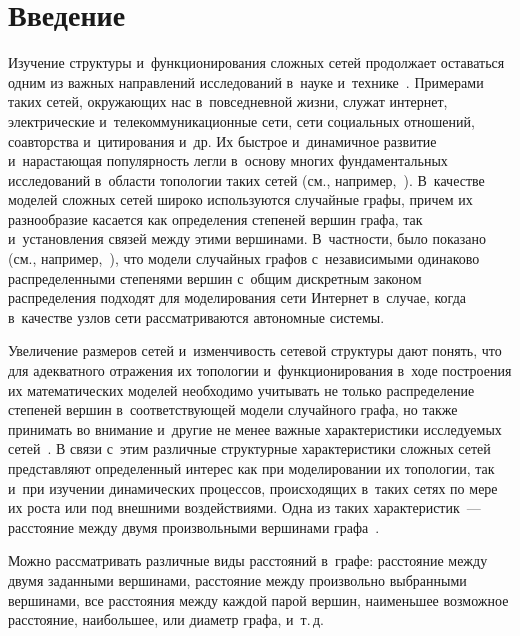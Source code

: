 
\thispagestyle{headings}

\begin{multicols}{2}

\label{st\stat}

\section{Введение}

\vspace*{-1pt}

Изучение структуры и~функционирования сложных сетей продолжает оставаться одним из важных
направлений исследований в~науке и~технике~\cite{Dur,Hof1}. Примерами таких сетей, окружающих
нас в~повседневной жизни, служат интернет, электрические и~телекоммуникационные сети, сети
социальных отношений, соавторства и~цитирования и~др.
Их быст\-рое и~динамичное развитие и~нарастающая популярность легли в~основу многих фундаментальных
исследований в~об\-ласти топологии таких сетей (см., например,~\cite{Dur,Hof1,Hof2,New1,New2}).
В~качестве моделей слож\-ных сетей широко используются случайные графы, причем их разнообразие
касается как определения степеней вершин графа, так и~уста\-нов\-ле\-ния связей между этими вершинами.
В~частности, было показано (см., например,~\cite{Fa,RN}), что модели случайных графов с~независимыми
одинаково распределенными степенями вершин с~общим дискретным законом распределения подходят для
моделирования сети Интернет в~случае, когда в~качестве узлов сети рассматриваются автономные системы.

Увеличение размеров сетей и~изменчивость сетевой структуры дают понять, что для адекватного отражения
их топологии и~функционирования в~ходе по\-стро\-ения их математических моделей необходимо учитывать не
только распределение степеней вершин в~со\-от\-вет\-ст\-ву\-ющей модели случайного графа, но также
принимать во внимание и~другие не менее важ\-ные характеристики исследуемых сетей~\cite{Hof1, New1}.
В связи с~этим различные структурные характеристики слож\-ных сетей пред\-став\-ля\-ют определенный интерес
как при моделировании их топологии, так и~при изучении динамических процессов, происходящих в~таких сетях
по мере их рос\-та или под внешними воздействиями. Одна из таких характеристик~---
рас\-сто\-яние между двумя произвольными вершинами графа~\cite{Dur, Hof2, New1}.

 Мож\-но рас\-смат\-ри\-вать различные
виды расстояний в~графе: расстояние между двумя заданными вершинами, рас\-сто\-яние между произвольно\linebreak
выбранными вершинами, все расстояния между каж\-дой парой вершин, наименьшее воз\-мож\-ное {рас\-сто\-яние},
наибольшее, или диаметр графа, и~т.\,д. 


\end{multicols}
